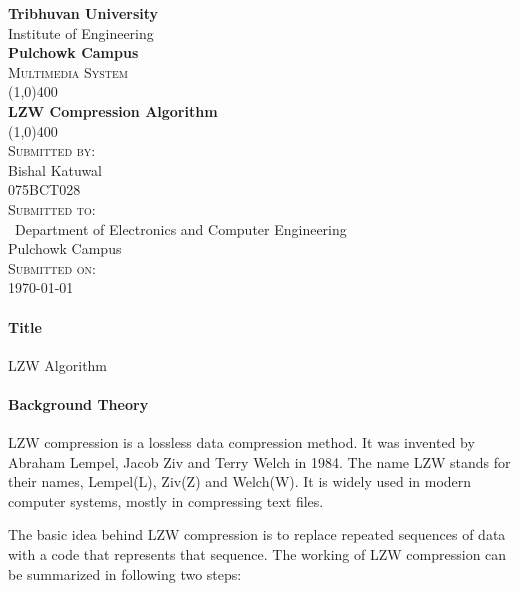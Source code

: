 \documentclass[12pt]{article}
\begin{document}
\begin{titlepage}
    \begin{center}
        \huge{\bfseries  Tribhuvan University}\\
        \Large{Institute of Engineering}\\
        \huge{ \bfseries  Pulchowk Campus}\\[3.2cm]


        \textsc{\Large Multimedia System}\\[-0.5cm]
        \line(1,0){400}\\
        \huge{\bfseries LZW Compression Algorithm}\\
        \line(1,0){400}\\


        \textsc{\Large Submitted by:}\\
        \Large Bishal Katuwal\\ \large 075BCT028\\    [0.85cm]

        \textsc{\Large Submitted to:}\\\
        \large Department of Electronics and Computer Engineering\\Pulchowk Campus\\    [0.85cm]
        
        \textsc{\Large Submitted on:}\\
        \today
        
    \end{center}
\end{titlepage}
\pagebreak
\paragraph{Title\\}
LZW Algorithm
\paragraph{Background Theory\\}
LZW compression is a lossless data compression method.
It was invented by Abraham Lempel, Jacob Ziv and Terry Welch in 1984.
The name LZW stands for their names, Lempel(L), Ziv(Z) and Welch(W).
It is widely used in modern computer systems, mostly in compressing text files.

The basic idea behind LZW compression is to replace repeated sequences of data with a code that represents that sequence.
The working of LZW compression can be summarized in following two steps:\\
\end{document}
